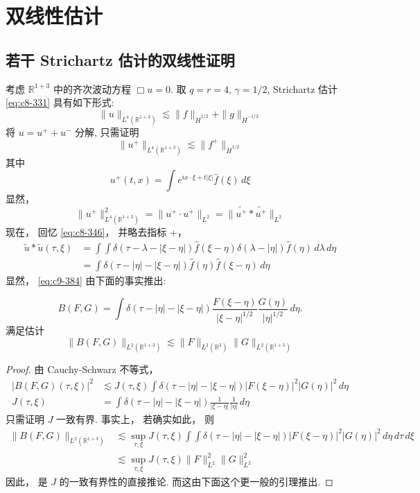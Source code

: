 \chapter{双线性估计}

\section{若干 Strichartz 估计的双线性证明}

考虑 $\mathbb{R}^{1+3}$ 中的齐次波动方程 $\Box u = 0$. 取 $q = r = 4$, $\gamma = 1/2$, Strichartz 估计 \eqref{eq:c8-331} 具有如下形式:
\[
\|u\|_{L^4(\mathbb{R}^{1+3})} \lesssim \|f\|_{\dot H^{1/2}} + \|g\|_{\dot H^{-1/2}}
\]
将 $u = u^{+} + u^{-}$ 分解, 只需证明
\begin{equation}
\|u^{+}\|_{L^4(\mathbb{R}^{1+3})} \lesssim \|f^{+}\|_{\dot H^{1/2}}\label{eq:c9-384}
\end{equation}
其中
\[
u^{+}(t, x) = \int e^{ix\cdot\xi + t|\xi|}\hat f(\xi)\, d\xi
\]
显然，
\[
\|u^{+}\|^2_{L^4(\mathbb{R}^{1+3})} = \|u^{+}\cdot u^{+}\|_{L^2} = \|\widetilde{u^{+}} * \widetilde{u^{+}}\|_{L^2}
\]
现在， 回忆 \eqref{eq:c8-346}， 并略去指标 +，
\[
\begin{aligned}
\tilde{u}*\tilde{u}(\tau, \xi) &= \int\int\delta(\tau - \lambda - |\xi-\eta|)\hat f(\xi-\eta)\delta(\lambda - |\eta|)\hat f(\eta)\, d\lambda\, d\eta\\
&= \int\delta(\tau - |\eta| - |\xi-\eta|)\hat f(\eta)\hat f(\xi-\eta)\, d\eta
\end{aligned}
\]
显然， \eqref{eq:c9-384} 由下面的事实推出:

\begin{theorem}\label{thm:c9-1.1}
\[
B(F, G) = \int\delta(\tau - |\eta| - |\xi-\eta|)\frac{F(\xi-\eta)}{|\xi-\eta|^{1/2}}\frac{G(\eta)}{|\eta|^{1/2}}\, d\eta.
\]
满足估计
\begin{equation}
\|B(F, G)\|_{L^2(\mathbb{R}^{1+3})} \lesssim \|F\|_{L^2(\mathbb{R}^3)}\|G\|_{L^2(\mathbb{R}^{1+3})}\label{eq:c9-385}
\end{equation}
\end{theorem}

\begin{proof}
由 Cauchy-Schwarz 不等式，
\[
\begin{aligned}
|B(F, G)(\tau, \xi)|^2 &\lesssim J(\tau, \xi)\int\delta(\tau - |\eta| - |\xi-\eta|)|F(\xi-\eta)|^2|G(\eta)|^2\, d\eta\\
J(\tau, \xi) &= \int\delta(\tau - |\eta| - |\xi-\eta|)\frac{1}{|\xi-\eta|}\frac{1}{|\eta|}\, d\eta
\end{aligned}
\]
只需证明 $J$ 一致有界. 事实上， 若确实如此， 则
\[
\begin{aligned}
\|B(F, G)\|_{L^2(\mathbb{R}^{1+3})} &\lesssim \sup_{\tau, \xi}J(\tau, \xi)\int\int\delta(\tau - |\eta| - |\xi-\eta|)|F(\xi-\eta)|^2|G(\eta)|^2\, d\eta\, d\tau\, d\xi\\
&\lesssim \sup_{\tau, \xi}J(\tau, \xi)\|F\|_{L^2}^2\|G\|_{L^2}^2
\end{aligned}
\]
因此， 是 $J$ 的一致有界性的直接推论. 而这由下面这个更一般的引理推出.
\end{proof}

